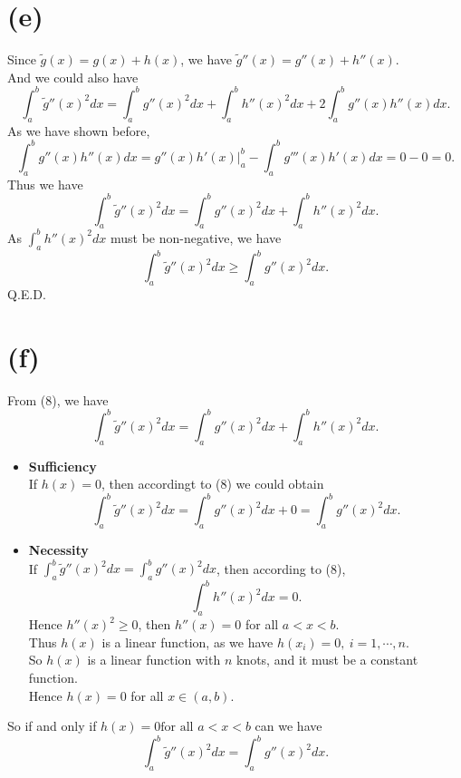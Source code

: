 \documentclass{article}
\begin{document}
\section*{(e)}
Since $\tilde{g}(x) = g(x) + h(x)$, we have $\tilde{g}''(x) = g''(x) + h''(x)$.\\
And we could also have
\begin{equation*}
    \int_{a}^{b} \tilde{g}''(x)^2dx = \int_{a}^{b} g''(x)^2dx + \int_{a}^{b} h''(x)^2dx + 2\int_{a}^{b} g''(x)h''(x)dx.
\end{equation*}
As we have shown before,
\begin{equation*}
    \int_{a}^{b} g''(x)h''(x)dx = g''(x)h'(x) \big|_{a}^{b} - \int_{a}^{b} g'''(x) h'(x)dx = 0 - 0 = 0.
\end{equation*}
Thus we have
\begin{equation}
    \int_{a}^{b} \tilde{g}''(x)^2dx = \int_{a}^{b} g''(x)^2dx + \int_{a}^{b} h''(x)^2dx.
\end{equation}
As $\int_{a}^{b} h''(x)^2dx$ must be non-negative, we have
\begin{equation*}
    \int_{a}^{b} \tilde{g}''(x)^2dx \geq \int_{a}^{b} g''(x)^2dx.
\end{equation*}
Q.E.D.
\section*{(f)}
From (8), we have
\begin{equation*}
    \int_{a}^{b} \tilde{g}''(x)^2dx = \int_{a}^{b} g''(x)^2dx + \int_{a}^{b} h''(x)^2dx.
\end{equation*}
\begin{itemize}
    \item \textbf{Sufficiency} \\
        If $h(x) = 0$, then accordingt to (8) we could obtain 
        \begin{equation*}
            \int_{a}^{b} \tilde{g}''(x)^2dx = \int_{a}^{b} g''(x)^2dx + 0 = \int_{a}^{b} g''(x)^2dx.
        \end{equation*}
    \item \textbf{Necessity}\\
        If $\int_{a}^{b} \tilde{g}''(x)^2dx = \int_{a}^{b} g''(x)^2dx$, then according to (8), 
        \begin{equation*}
            \int_{a}^{b} h''(x)^2dx = 0.
        \end{equation*}
        Hence $h''(x)^2 \geq 0$, then $h''(x) = 0$ for all $a < x <b$. \\
        Thus $h(x)$ is a linear function, as we have $h(x_i) = 0, \ i = 1, \cdots, n$. \\
        So $h(x)$ is a linear function with $n$ knots, and it must be a constant function. \\
        Hence $h(x) = 0$ for all $x \in (a, b)$. \\
\end{itemize}
So if and only if $h(x) = 0 \text{for all } a < x < b$ can we have 
\begin{equation*}
    \int_{a}^{b} \tilde{g}''(x)^2dx = \int_{a}^{b} g''(x)^2dx. 
\end{equation*}
\end{document}
